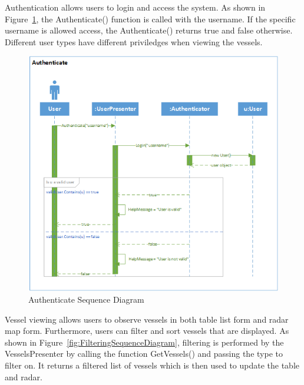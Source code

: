 \documentclass[12pt]{article}
\begin{document}
\par
Authentication allows users to login and access the system. As shown in Figure~\ref{fig:AuthenticateSequenceDiagram}, the Authenticate() function is called with the username. If the specific username is allowed access, the Authenticate() returns true and false otherwise. Different user types have different priviledges when viewing the vessels.

\begin{figure}[h!]
    \centering
    \includegraphics[scale=1]{2_1_authenticate}
    \caption{Authenticate Sequence Diagram}
    \label{fig:AuthenticateSequenceDiagram}
\end{figure}

\par
Vessel viewing allows users to observe vessels in both table list form and radar map form.
Furthermore, users can filter and sort vessels that are displayed. As shown in Figure~\ref{fig:FilteringSequenceDiagram}, filtering is performed by the VesselsPresenter by calling the function GetVessels() and passing the type to filter on. It returns a filtered list of vessels which is then used to update the table and radar.
\end{document}
